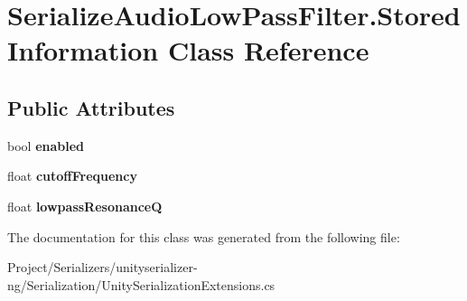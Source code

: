 \hypertarget{class_serialize_audio_low_pass_filter_1_1_stored_information}{}\section{Serialize\+Audio\+Low\+Pass\+Filter.\+Stored\+Information Class Reference}
\label{class_serialize_audio_low_pass_filter_1_1_stored_information}
\subsection*{Public Attributes}
\begin{DoxyCompactItemize}
\item 
\mbox{\label{class_serialize_audio_low_pass_filter_1_1_stored_information_a42854bafd9f6c28aa8bb0728ea5c1c3c}} 
bool {\bfseries enabled}
\item 
\mbox{\label{class_serialize_audio_low_pass_filter_1_1_stored_information_ab1614cb1acaf00072f48d290de361b99}} 
float {\bfseries cutoff\+Frequency}
\item 
\mbox{\label{class_serialize_audio_low_pass_filter_1_1_stored_information_a8a19c55d7044c2ebd3cdbb71cf2f97aa}} 
float {\bfseries lowpass\+ResonanceQ}
\end{DoxyCompactItemize}


The documentation for this class was generated from the following file\+:\begin{DoxyCompactItemize}
\item 
Project/\+Serializers/unityserializer-\/ng/\+Serialization/Unity\+Serialization\+Extensions.\+cs\end{DoxyCompactItemize}
